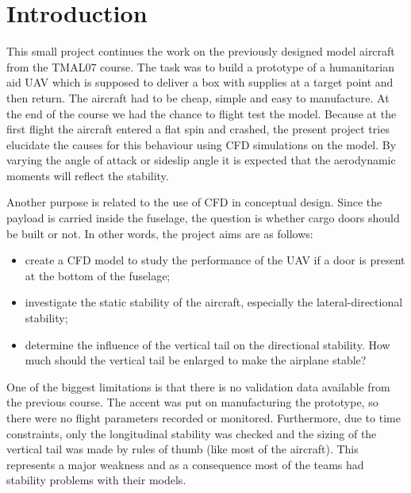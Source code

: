 \documentclass[11pt,a4paper,twoside,oneside]{article}
\begin{document}
\thispagestyle{plain}

\section{Introduction}

\vspace{.6cm}

\noindent
This small project continues the work on the previously designed model aircraft from the TMAL07 course. The task was to build a prototype of a humanitarian aid UAV which is supposed to deliver a box with supplies at a target point and then return. The aircraft had to be cheap, simple and easy to manufacture. At the end of the course we had the chance to flight test the model. Because at the first flight the aircraft entered a flat spin and crashed, the present project tries elucidate the causes for this behaviour using CFD simulations on the model. By varying the angle of attack or sideslip angle it is expected that the aerodynamic moments will reflect the stability. 

Another purpose is related to the use of CFD in conceptual design. Since the payload is carried inside the fuselage, the question is whether cargo doors should be built or not. In other words, the project aims are as follows:
\begin{itemize} \setlength\itemsep{0em}
  \item[$-$] create a CFD model to study the performance of the UAV if a door is present at the bottom of the fuselage;
  \item[$-$] investigate the static stability of the aircraft, especially the lateral-directional stability; 
  \item[$-$] determine the influence of the vertical tail on the directional stability. How much should the vertical tail be enlarged to make the airplane stable?
\end{itemize}

One of the biggest limitations is that there is no validation data available from the previous course. The accent was put on manufacturing the prototype, so there were no flight parameters recorded or monitored. Furthermore, due to time constraints, only the longitudinal stability was checked and the sizing of the vertical tail was made by rules of thumb (like most of the aircraft). This represents a major weakness and as a consequence most of the teams had stability problems with their models.   
\end{document}
